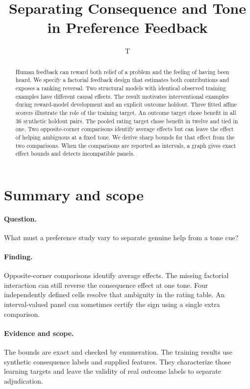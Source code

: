 \documentclass[11pt]{article}
\title{Separating Consequence and Tone in Preference Feedback}
\author{T}
\date{}
\begin{document}
\maketitle

\begin{abstract}
Human feedback can reward both relief of a
problem and the feeling of having been heard. We specify a factorial
feedback design that estimates both contributions and exposes a ranking
reversal. Two structural models with identical observed training examples
have different causal effects. The result motivates interventional
examples during reward-model development and an explicit outcome holdout.
Three fitted affine scorers illustrate the role of the training target.
An outcome target chose benefit in all 36 synthetic holdout pairs.
The pooled rating target chose benefit in twelve and tied in one.
Two opposite-corner comparisons identify average effects but can
leave the effect of helping ambiguous at a fixed tone. We derive
sharp bounds for that effect from the two comparisons. When the
comparisons are reported as intervals, a graph gives exact effect
bounds and detects incompatible panels.
\end{abstract}

\section*{Summary and scope}
\paragraph{Question.} What must a preference study vary to separate
genuine help from a tone cue?
\paragraph{Finding.} Opposite-corner comparisons identify average
effects. The missing factorial interaction can still reverse the
consequence effect at one tone. Four independently defined cells
resolve that ambiguity in the rating table. An interval-valued panel
can sometimes certify the sign using a single extra comparison.
\paragraph{Evidence and scope.} The bounds are exact and
checked by enumeration. The training results use synthetic consequence
labels and supplied features. They characterize those learning targets
and leave the validity of real outcome labels to separate adjudication.
\end{document}
